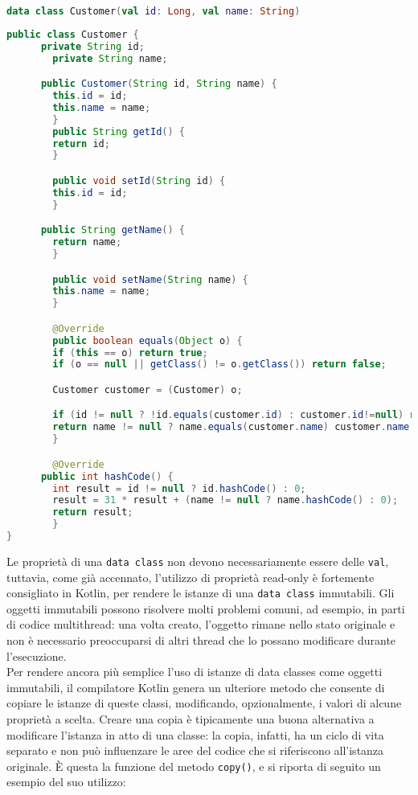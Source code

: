 \begin{lstlisting}[caption={Data Class in Kotlin}, captionpos=b, label={lst:exampleDataClassKt}, language=Kotlin]
data class Customer(val id: Long, val name: String)
\end{lstlisting}

\begin{lstlisting}[caption={Data Class corrispondente scritta in Java}, captionpos=b, label={lst:exampleDataClassJava}, language=Java]
public class Customer {
   	  private String id;
    	private String name;

      public Customer(String id, String name) {
        this.id = id;
        this.name = name;
    	}
    	public String getId() {
        return id;
    	}

    	public void setId(String id) {
        this.id = id;
    	}

   	  public String getName() {
        return name;
    	}

    	public void setName(String name) {
        this.name = name;
    	}

    	@Override
    	public boolean equals(Object o) {
        if (this == o) return true;
        if (o == null || getClass() != o.getClass()) return false;

        Customer customer = (Customer) o;

        if (id != null ? !id.equals(customer.id) : customer.id!=null) return false;
        return name != null ? name.equals(customer.name) customer.name == null;
    	}

    	@Override
   	  public int hashCode() {
        int result = id != null ? id.hashCode() : 0;
        result = 31 * result + (name != null ? name.hashCode() : 0);
        return result;
    	}
}
\end{lstlisting}

Le proprietà di una \texttt{data class} non devono necessariamente essere delle \texttt{val}, tuttavia, come già accennato, l’utilizzo di proprietà read-only è fortemente consigliato in Kotlin, per rendere le istanze di una \texttt{data class} immutabili. Gli oggetti immutabili possono risolvere molti problemi comuni, ad esempio, in parti di codice multithread: una volta creato, l’oggetto rimane nello stato originale e non è necessario preoccuparsi di altri thread che lo possano modificare durante l’esecuzione.\\
Per rendere ancora più semplice l'uso di istanze di data classes come oggetti immutabili, il compilatore Kotlin genera un ulteriore metodo che consente di copiare le istanze di queste classi, modificando, opzionalmente, i valori di alcune proprietà a scelta. Creare una copia è tipicamente una buona alternativa a modificare l'istanza in atto di una classe: la copia, infatti, ha un ciclo di vita separato e non può influenzare le aree del codice che si riferiscono all'istanza originale. È questa la funzione del metodo \texttt{copy()}, e si riporta di seguito un esempio del suo utilizzo:\\

